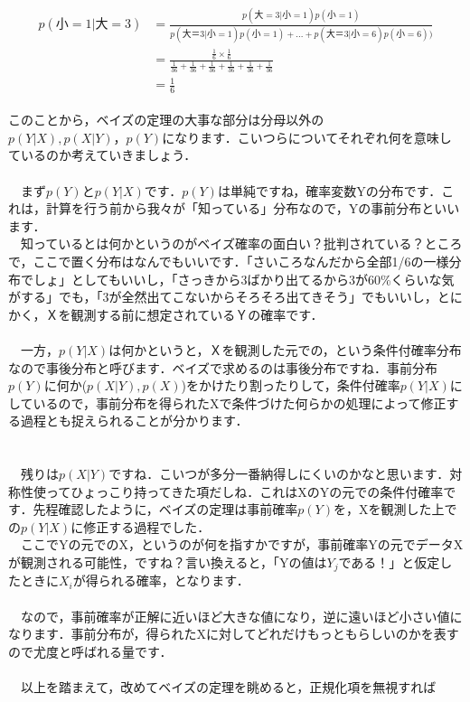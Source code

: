 \documentclass[11pt,a4paper]{jsarticle}                    %
\begin{document}
\begin{eqnarray}
\begin{split}
p(小=1|大=3) &= \frac{p(大=3|小=1)p(小=1)}{p(大＝3|小=1)p(小=1) + ... + p(大＝3|小=6)p(小=6))}\\
&= \frac{\frac{1}{6} \times \frac{1}{6}}{\frac{1}{36} + \frac{1}{36} + \frac{1}{36} + \frac{1}{36} + \frac{1}{36}+ \frac{1}{36}}\\
&= \frac{1}{6}
\end{split}
\end{eqnarray}

このことから，ベイズの定理の大事な部分は分母以外の$p(Y|X), p(X|Y)，p(Y)$になります．こいつらについてそれぞれ何を意味しているのか考えていきましょう．\\
\\
　まず$p(Y)$と$p(Y|X)$です．$p(Y)$は単純ですね，確率変数Yの分布です．これは，計算を行う前から我々が「知っている」分布なので，Yの事前分布といいます．\\
　知っているとは何かというのがベイズ確率の面白い？批判されている？ところで，ここで置く分布はなんでもいいです．「さいころなんだから全部1/6の一様分布でしょ」としてもいいし，「さっきから3ばかり出てるから3が60\%くらいな気がする」でも，「3が全然出てこないからそろそろ出てきそう」でもいいし，とにかく，Ｘを観測する前に想定されているＹの確率です．\\
\\
　一方，$p(Y|X)$は何かというと，Ｘを観測した元での，という条件付確率分布なので事後分布と呼びます．ベイズで求めるのは事後分布ですね．事前分布$p(Y)$に何か($p(X|Y), p(X)$)をかけたり割ったりして，条件付確率$p(Y|X)$にしているので，事前分布を得られたXで条件づけた何らかの処理によって修正する過程とも捉えられることが分かります．\\
\\
\\
　残りは$p(X|Y)$ですね．こいつが多分一番納得しにくいのかなと思います．対称性使ってひょっこり持ってきた項だしね．これはXのYの元での条件付確率です．先程確認したように，ベイズの定理は事前確率$p(Y)$を，Xを観測した上での$p(Y|X)$に修正する過程でした．\\
　ここでYの元でのX，というのが何を指すかですが，事前確率Yの元でデータXが観測される可能性，ですね？言い換えると，「Yの値は$Y_j$である！」と仮定したときに$X_i$が得られる確率，となります．\\
\\
　なので，事前確率が正解に近いほど大きな値になり，逆に遠いほど小さい値になります．事前分布が，得られたXに対してどれだけもっともらしいのかを表すので尤度と呼ばれる量です．\\
\\
　以上を踏まえて，改めてベイズの定理を眺めると，正規化項を無視すれば
\end{document}
